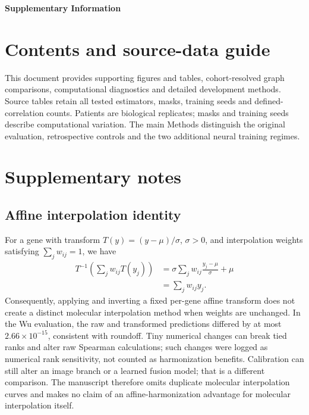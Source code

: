 
\begin{center}
{\Large\bfseries Supplementary Information\par}
\vspace{10pt}
{\large\bfseries \PaperTitle\par}
\vspace{12pt}
\AuthorNames\par
\AuthorAffiliations\par
\Correspondence\par
\end{center}
\section*{Contents and source-data guide}
This document provides supporting figures and tables, cohort-resolved graph comparisons, computational diagnostics and detailed development methods. Source tables retain all tested estimators, masks, training seeds and defined-correlation counts. Patients are biological replicates; masks and training seeds describe computational variation. The main Methods distinguish the original evaluation, retrospective controls and the two additional neural training regimes.
\clearpage
\section{Supplementary notes}
\subsection{Affine interpolation identity}
For a gene with transform $T(y)=(y-\mu)/\sigma$, $\sigma>0$, and interpolation weights satisfying $\sum_j w_{ij}=1$, we have
\begin{align*}
T^{-1}\!\left(\sum_j w_{ij}T(y_j)\right)
&=\sigma\sum_jw_{ij}\frac{y_j-\mu}{\sigma}+\mu\\
&=\sum_j w_{ij}y_j.
\end{align*}
Consequently, applying and inverting a fixed per-gene affine transform does not create a distinct molecular interpolation method when weights are unchanged. In the Wu evaluation, the raw and transformed predictions differed by at most $2.66\times10^{-15}$, consistent with roundoff. Tiny numerical changes can break tied ranks and alter raw Spearman calculations; such changes were logged as numerical rank sensitivity, not counted as harmonization benefits. Calibration can still alter an image branch or a learned fusion model; that is a different comparison. The manuscript therefore omits duplicate molecular interpolation curves and makes no claim of an affine-harmonization advantage for molecular interpolation itself.

